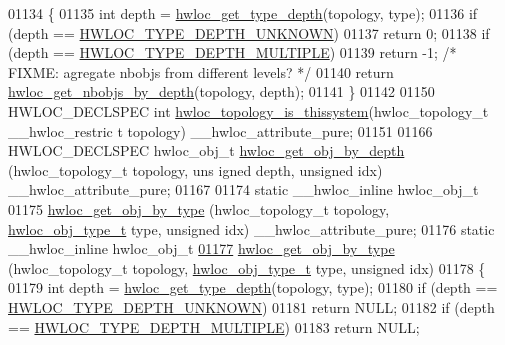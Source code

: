 \begin{DoxyCode}
01134 \{
01135         \textcolor{keywordtype}{int} depth = \hyperlink{a00046_gaea7c64dd59467f5201ba87712710b14d}{hwloc_get_type_depth}(topology, type);
01136         \textcolor{keywordflow}{if} (depth == \hyperlink{a00046_ggaf4e663cf42bbe20756b849c6293ef575a0565ab92ab72cb0cec91e23003294aad}{HWLOC_TYPE_DEPTH_UNKNOWN})
01137                 \textcolor{keywordflow}{return} 0;
01138         \textcolor{keywordflow}{if} (depth == \hyperlink{a00046_ggaf4e663cf42bbe20756b849c6293ef575ae99465995cacde6c210d5fc2e409798c}{HWLOC_TYPE_DEPTH_MULTIPLE})
01139                 \textcolor{keywordflow}{return} -1; \textcolor{comment}{/* FIXME: agregate nbobjs from different levels? */}
01140         \textcolor{keywordflow}{return} \hyperlink{a00046_ga20cfe2456f4cfdd789c9aca6d2fdd69f}{hwloc_get_nbobjs_by_depth}(topology, depth);
01141 \}
01142 
01150 HWLOC\_DECLSPEC \textcolor{keywordtype}{int} \hyperlink{a00046_ga0d109e33fc7990f62f665d336e5e5111}{hwloc_topology_is_thissystem}(hwloc\_topology\_t  \_\_hwloc\_restric
      t topology) \_\_hwloc\_attribute\_pure;
01151 
01166 HWLOC\_DECLSPEC hwloc\_obj\_t \hyperlink{a00047_gaedd78240b0c1108355586a268ec5a697}{hwloc_get_obj_by_depth} (hwloc\_topology\_t topology, \textcolor{keywordtype}{uns
      igned} depth, \textcolor{keywordtype}{unsigned} idx) \_\_hwloc\_attribute\_pure;
01167 
01174 \textcolor{keyword}{static} \_\_hwloc\_inline hwloc\_obj\_t
01175 \hyperlink{a00047_ga9be4a03488cdd0fb431e4aa1cbdea895}{hwloc_get_obj_by_type} (hwloc\_topology\_t topology, \hyperlink{a00041_gacd37bb612667dc437d66bfb175a8dc55}{hwloc_obj_type_t} type, \textcolor{keywordtype}{unsigned
      } idx) \_\_hwloc\_attribute\_pure;
01176 \textcolor{keyword}{static} \_\_hwloc\_inline hwloc\_obj\_t
\hypertarget{a00033_source_l01177}{}\hyperlink{a00047_ga9be4a03488cdd0fb431e4aa1cbdea895}{01177} \hyperlink{a00047_ga9be4a03488cdd0fb431e4aa1cbdea895}{hwloc_get_obj_by_type} (hwloc\_topology\_t topology, \hyperlink{a00041_gacd37bb612667dc437d66bfb175a8dc55}{hwloc_obj_type_t} type, \textcolor{keywordtype}{unsigned
      } idx)
01178 \{
01179   \textcolor{keywordtype}{int} depth = \hyperlink{a00046_gaea7c64dd59467f5201ba87712710b14d}{hwloc_get_type_depth}(topology, type);
01180   \textcolor{keywordflow}{if} (depth == \hyperlink{a00046_ggaf4e663cf42bbe20756b849c6293ef575a0565ab92ab72cb0cec91e23003294aad}{HWLOC_TYPE_DEPTH_UNKNOWN})
01181     \textcolor{keywordflow}{return} NULL;
01182   \textcolor{keywordflow}{if} (depth == \hyperlink{a00046_ggaf4e663cf42bbe20756b849c6293ef575ae99465995cacde6c210d5fc2e409798c}{HWLOC_TYPE_DEPTH_MULTIPLE})
01183     \textcolor{keywordflow}{return} NULL;

\end{DoxyCode}
